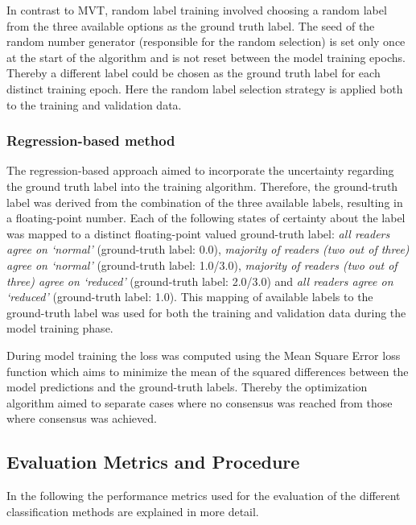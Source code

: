In contrast to MVT, random label training involved choosing a random label from the three available options
as the ground truth label.
The seed of the random number generator (responsible for the random selection) is set only once at the start of the
algorithm and is not reset between the model training epochs.
Thereby a different label could be chosen as the ground truth label for each distinct training epoch.
Here the random label selection strategy is applied both to the training and validation data.

\subsubsection{Regression-based method}
\label{subsubsec:cnn_based_classification_regression}

The regression-based approach aimed to incorporate the uncertainty regarding the ground truth label 
into the training algorithm.
Therefore, the ground-truth label was derived from the combination of the three available labels, 
resulting in a floating-point number.
Each of the following states of certainty about the label was mapped to a distinct 
floating-point valued ground-truth label: 
\emph{all readers agree on `normal' } (ground-truth label: 0.0), 
\emph{majority of readers (two out of three) agree on `normal'} (ground-truth label: 1.0/3.0), 
\emph{majority of readers (two out of three) agree on `reduced'} (ground-truth label: 2.0/3.0) 
and \emph{all readers agree on `reduced'} (ground-truth label: 1.0).
This mapping of available labels to the ground-truth label was used for both the training 
and validation data during the model training phase.

During model training the loss was computed using the Mean Square Error loss function 
which aims to minimize the mean of the squared differences between the model predictions and the ground-truth labels.
Thereby the optimization algorithm aimed to separate cases where no consensus was reached from those where 
consensus was achieved.

\subsection{Evaluation Metrics and Procedure}
\label{subsec:eval_metrics_proced}

In the following the performance metrics used for the evaluation of the different classification methods 
are explained in more detail.

